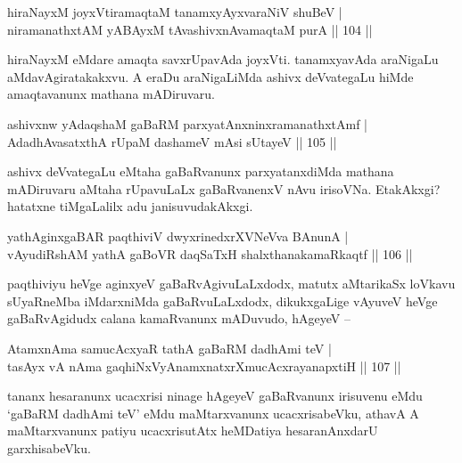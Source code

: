 
\begin{shl}
hiraNayxM joyxVtiramaqtaM tanamxyAyxvaraNiV shuBeV | \\
niramanathxtAM yABAyxM tAvashivxnAvamaqtaM purA \hfill|| 104 || 
\end{shl}

\begin{artha}
hiraNayxM eMdare amaqta savxrUpavAda joyxVti. tanamxyavAda araNigaLu 
aMdavAgiratakakxvu. A eraDu araNigaLiMda ashivx deVvategaLu hiMde 
amaqtavanunx mathana mADiruvaru.
\end{artha}

\begin{shl}
ashivxnw yAdaqshaM gaBaRM parxyatAnxninxramanathxtAmf | \\
AdadhAvasatxthA rUpaM dashameV mAsi sUtayeV \hfill|| 105 || 
\end{shl}

\begin{artha}
ashivx deVvategaLu eMtaha gaBaRvanunx parxyatanxdiMda mathana 
mADiruvaru aMtaha rUpavuLaLx gaBaRvanenxV nAvu irisoVNa. EtakAkxgi? 
hatatxne tiMgaLalilx adu janisuvudakAkxgi.
\end{artha}


\begin{shl}
yathA\s ginxgaBAR paqthiviV dwyxrinedxrXVNeVva BAnunA | \\
vAyudiRshAM yathA gaBoVR daqSaTxH shalxthanakamaRkaqtf \hfill|| 106 || 
\end{shl}

\begin{artha}
paqthiviyu heVge aginxyeV gaBaRvAgivuLaLxdodx, matutx aMtarikaSx 
loVkavu sUyaRneMba iMdarxniMda gaBaRvuLaLxdodx, dikukxgaLige vAyuveV
heVge gaBaRvAgidudx calana kamaRvanunx mADuvudo, hAgeyeV {\rm --}
\end{artha}


\begin{shl}
AtamxnAma samucAcxyaR tathA gaBaRM dadhAmi teV | \\
tasAyx vA nAma gaqhiNxVyAnamxnatxrXmucAcxrayanapxtiH \hfill|| 107 ||  
\end{shl}

\begin{artha}
tananx hesaranunx ucacxrisi ninage hAgeyeV gaBaRvanunx irisuvenu eMdu 
`gaBaRM dadhAmi teV' eMdu maMtarxvanunx ucacxrisabeVku, athavA A 
maMtarxvanunx patiyu ucacxrisutAtx heMDatiya hesaranAnxdarU 
garxhisabeVku.
\end{artha}

